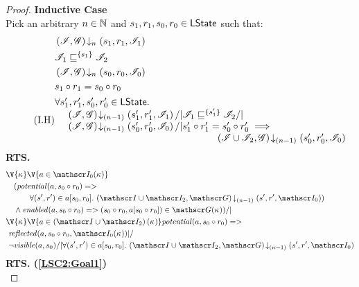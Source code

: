 \begin{lemma}
\begin{proof}
\noindent\textbf{Inductive Case}\\
Pick an arbitrary $n \in \mathbb{N}$ and $s_1, r_1, s_0, r_0 \in \textsf{LState}$ such that:
\begin{align}
	&\extendsAMUpto{\lmod, \gmod}{n}{s_1}{r_1}{\lmod_1} \label{LSC2:Ass1}\\
	&\lmod_1 \weakenI{\{s_1\}} \lmod_2 \label{LSC2:Ass2}\\
	& \extendsAMUpto{\lmod, \gmod}{n}{s_0}{r_0}{\lmod_0} \label{LSC2:Ass3}\\
	& s_1 \composeL r_1 = s_0 \composeL r_0 \label{LSC2:Ass4}\\
	\tag{I.H}	
	&\begin{array}{@{} l @{\hspace{-3cm}} l @{\hspace*{-2cm}} l @{}}
		\for{s'_1, r'_1, s'_0, r'_0 \in \LStates} &&\\
		& \extendsAMUpto{\lmod, \gmod}{(n-1)}{s'_1}{r'_1}{\lmod_1} /| \lmod_1 \weakenI{\{s'_1\}} \lmod_2 /| & \\
		& \extendsAMUpto{\lmod, \gmod}{(n-1)}{s'_0}{r'_0}{\lmod_0} /| s'_1 \composeL r'_1 = s'_0 \composeL r'_0 \implies & \\
		&& \extendsAMUpto{\lmod \cup \lmod_2, \gmod}{(n-1)}{s'_0}{r'_0}{\lmod_0}
	\end{array} \label{LSC2:IH}
\end{align}
%
\textbf{RTS. } 
%
\begin{align}
	& 
	\V{\ca{}}  \V{a\in \lmod_0(\ca{})} \nonumber \\
  &\quad (\m{potential}(a,s_0 \composeL r_0)  => \nonumber\\
  & \quad\qquad \for{(s', r') \in a[s_0, r_0]} \extendsAMUpto{\lmod \cup \lmod_2, \gmod}{(n-1)}{s'}{r'}{\lmod_0}) \label{LSC2:Goal1}\\
%   
  &\quad\land \m{enabled}(a,s_0 \composeL r_0)
  => (s_0 \composeL r_0, a[s_0 \composeL r_0])\in \gmod(\ca{}))
  /|\null \label{LSC2:Goal2}\\
%  
  &\V{\ca{}}\V{a\in \left(\lmod \cup \lmod_2 \right) (\ca{})}
  \m{potential}(a, s_0 \composeL r_0) =>\null \nonumber \\
  &\ \m{reflected}(a, s_0 \composeL r_0,\lmod_0(\ca{})) |/\null \nonumber \\
%  
  &\ \neg\m{visible}(a, s_0) /| \for{(s', r') \in a[s_0, r_0]} \extendsAMUpto{\lmod \cup \lmod_2, \gmod}{(n-1)}{s'}{r'}{\lmod_0}  \label{LSC2:Goal3}
\end{align}
%
\noindent\textbf{RTS. (\ref{LSC2:Goal1})} \\

\end{proof}
\end{lemma}

